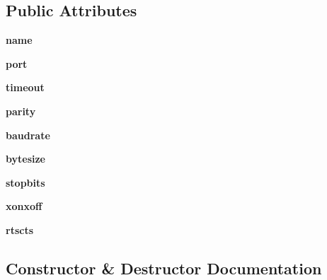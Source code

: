\subsection*{Public Attributes}
\begin{DoxyCompactItemize}
\item 
\mbox{\label{classfake_serial_1_1_serial_af3d8449c9f1992bbe479981375083651}} 
{\bfseries name}
\item 
\mbox{\label{classfake_serial_1_1_serial_a53d2e25f2f6b6654ba6740cb57242758}} 
{\bfseries port}
\item 
\mbox{\label{classfake_serial_1_1_serial_aac1940cde2e2c8018d9be60b53bd6644}} 
{\bfseries timeout}
\item 
\mbox{\label{classfake_serial_1_1_serial_a0b5e1c24e2dd47ba832bd4a26b5c0027}} 
{\bfseries parity}
\item 
\mbox{\label{classfake_serial_1_1_serial_afe5ee18e12722951265fdd9d4fa81a51}} 
{\bfseries baudrate}
\item 
\mbox{\label{classfake_serial_1_1_serial_afc2c7273bcb952833c250bda88ba2d08}} 
{\bfseries bytesize}
\item 
\mbox{\label{classfake_serial_1_1_serial_ac0e590a34ac343c929e4a8543e933cce}} 
{\bfseries stopbits}
\item 
\mbox{\label{classfake_serial_1_1_serial_a66d563b6efbcddbe5b6b295f5446a268}} 
{\bfseries xonxoff}
\item 
\mbox{\label{classfake_serial_1_1_serial_aadb7fe53208ef570c79b1b66d8eb2ad7}} 
{\bfseries rtscts}
\end{DoxyCompactItemize}


\subsection{Constructor \& Destructor Documentation}
\mbox{\label{classfake_serial_1_1_serial_abcf3b27b5edb193420574f383ff1603c}} 
